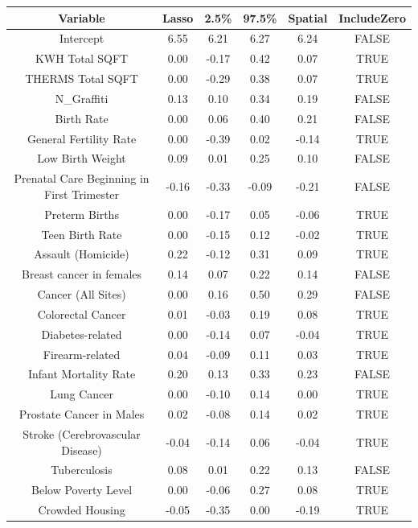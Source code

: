 \documentclass{article} %
\begin{document}
\begin{table}[H]
\centering
\begin{adjustbox}{width = \textwidth}
\begin{tabular}{cccccc}
  \hline
Variable & Lasso & 2.5\% & 97.5\% & Spatial & IncludeZero \\ 
  \hline
Intercept & 6.55 & 6.21 & 6.27 & 6.24 & FALSE \\ 
  KWH Total SQFT & 0.00 & -0.17 & 0.42 & 0.07 & TRUE \\ 
  THERMS Total SQFT & 0.00 & -0.29 & 0.38 & 0.07 & TRUE \\ 
  N\_Graffiti & 0.13 & 0.10 & 0.34 & 0.19 & FALSE \\ 
  Birth Rate & 0.00 & 0.06 & 0.40 & 0.21 & FALSE \\ 
  General Fertility Rate & 0.00 & -0.39 & 0.02 & -0.14 & TRUE \\ 
  Low Birth Weight & 0.09 & 0.01 & 0.25 & 0.10 & FALSE \\ 
  Prenatal Care Beginning in First Trimester & -0.16 & -0.33 & -0.09 & -0.21 & FALSE \\ 
  Preterm Births & 0.00 & -0.17 & 0.05 & -0.06 & TRUE \\ 
  Teen Birth Rate & 0.00 & -0.15 & 0.12 & -0.02 & TRUE \\ 
  Assault (Homicide) & 0.22 & -0.12 & 0.31 & 0.09 & TRUE \\ 
  Breast cancer in females & 0.14 & 0.07 & 0.22 & 0.14 & FALSE \\ 
  Cancer (All Sites) & 0.00 & 0.16 & 0.50 & 0.29 & FALSE \\ 
  Colorectal Cancer & 0.01 & -0.03 & 0.19 & 0.08 & TRUE \\ 
  Diabetes-related & 0.00 & -0.14 & 0.07 & -0.04 & TRUE \\ 
  Firearm-related & 0.04 & -0.09 & 0.11 & 0.03 & TRUE \\ 
  Infant Mortality Rate & 0.20 & 0.13 & 0.33 & 0.23 & FALSE \\ 
  Lung Cancer & 0.00 & -0.10 & 0.14 & 0.00 & TRUE \\ 
  Prostate Cancer in Males & 0.02 & -0.08 & 0.14 & 0.02 & TRUE \\ 
  Stroke (Cerebrovascular Disease) & -0.04 & -0.14 & 0.06 & -0.04 & TRUE \\ 
  Tuberculosis & 0.08 & 0.01 & 0.22 & 0.13 & FALSE \\ 
  Below Poverty Level & 0.00 & -0.06 & 0.27 & 0.08 & TRUE \\ 
  Crowded Housing & -0.05 & -0.35 & 0.00 & -0.19 & TRUE \\ 

\end{tabular}
\end{adjustbox}
\end{table}
\end{document}
